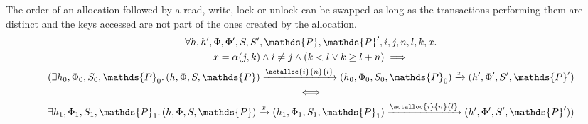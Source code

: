 \lem The order of an allocation followed by a read, write, lock or unlock can be swapped as long as the transactions performing them are distinct and the keys accessed are not part of the ones created by the allocation.
\begin{gather*}
	\forall h, h', \Phi, \Phi', S, S', \mathds{P}, \mathds{P}', i, j, n, l, k, x \ldotp \\
	x = \alpha(j, k) \land i \neq j \land (k < l \lor k \geq l + n) \implies \\
	(\exists h_0, \Phi_0, S_0, \mathds{P}_0 \ldotp 
	(h, \Phi, S, \mathds{P}) \xrightarrow{\actalloc{i}{n}{l}} (h_0, \Phi_0, S_0, \mathds{P}_0)  \xrightarrow{x} (h', \Phi', S', \mathds{P}') \\
	\iff \\
	\exists h_1, \Phi_1, S_1, \mathds{P}_1 \ldotp
	(h, \Phi, S, \mathds{P}) \xrightarrow{x} (h_1, \Phi_1, S_1, \mathds{P}_1) \xrightarrow{\actalloc{i}{n}{l}} (h', \Phi', S', \mathds{P}'))
\end{gather*}
